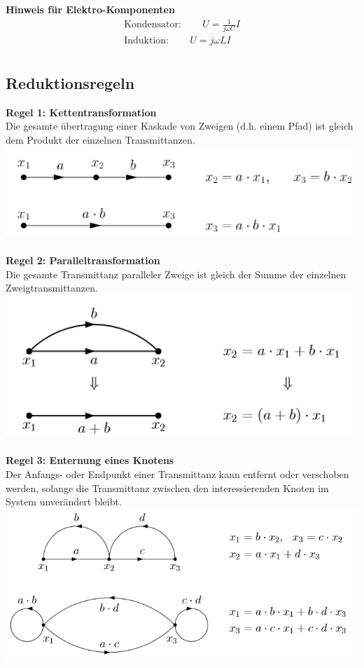 \noindent\textbf{Hinweis für Elektro-Komponenten}
\begin{align*}
	\text{Kondensator}: \qquad U = \frac{1}{j\omega C}I \\
	\text{Induktion}: \qquad U = j\omega L I \\
\end{align*}

\subsection{Reduktionsregeln}
\noindent\textbf{Regel 1: Kettentransformation}\\
 Die gesamte übertragung einer Kaskade von Zweigen (d.h. einem Pfad) ist gleich dem Produkt der einzelnen Transmittanzen.\\
\includegraphics[width=\columnwidth]{Images/sfd_r1}~\\

\noindent\textbf{Regel 2: Paralleltransformation}\\
 Die gesamte Transmittanz paralleler Zweige ist gleich der Summe der einzelnen Zweigtransmittanzen.\\
\includegraphics[width=\columnwidth]{Images/sfd_r2}~\\

\noindent\textbf{Regel 3: Enternung eines Knotens}\\
 Der Anfangs- oder Endpunkt einer Transmittanz kann entfernt
oder verschoben werden, solange die Transmittanz zwischen
den interessierenden Knoten im System unverändert bleibt.\\
\includegraphics[width=\columnwidth]{Images/sfd_r3}~\\

